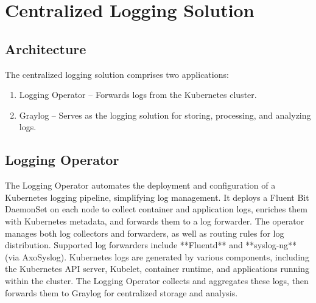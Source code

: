 \documentclass[../main.tex]{subfiles}
\begin{document}
\section{Centralized Logging Solution}

\subsection{Architecture}
The centralized logging solution comprises two applications:

\begin{enumerate}
    \item Logging Operator – Forwards logs from the Kubernetes cluster. 
    \item Graylog – Serves as the logging solution for storing, processing, and analyzing logs.
\end{enumerate}

\subsection{Logging Operator}

The Logging Operator \cite{logoperator} automates the deployment and configuration of a Kubernetes logging pipeline, simplifying log management. It deploys a Fluent Bit DaemonSet 
on each node to collect container and application logs, enriches them with Kubernetes metadata, and forwards them to a log forwarder. The operator manages both log collectors and forwarders, as well as routing rules for log distribution. Supported log forwarders include **Fluentd** and **syslog-ng** (via AxoSyslog).
Kubernetes logs are generated by various components, including the Kubernetes API server, Kubelet, container runtime, and applications running within the cluster. The Logging Operator collects and aggregates these logs, then forwards them to Graylog for centralized storage and analysis.
\end{document}
